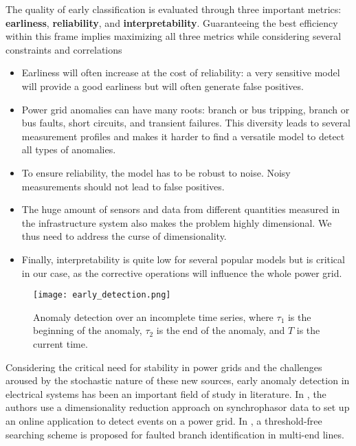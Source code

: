 The quality of early classification is evaluated through three important metrics:  \textbf{earliness}, \textbf{reliability}, and \textbf{interpretability}. Guaranteeing the best efficiency within this frame implies maximizing all three metrics while considering several constraints and correlations
\begin{itemize}
    \item Earliness will often increase at the cost of reliability: a very sensitive model will provide a good earliness but will often generate false positives.
    \item Power grid anomalies can have many roots: branch or bus tripping, branch or bus faults, short circuits, and transient failures. This diversity leads to several measurement profiles and makes it harder to find a versatile model to detect all types of anomalies.
    \item To ensure reliability, the model has to be robust to noise. Noisy measurements should not lead to false positives.
    \item The huge amount of sensors and data from different quantities measured in the infrastructure system also makes the problem highly dimensional. We thus need to address the curse of dimensionality.
    \item Finally, interpretability is quite low for several popular models \cite{Nazir202163} but is critical in our case, as the corrective operations will influence the whole power grid.
\end{itemize}

\begin{figure}[t]
	\centering
    \texttt{[image: early\_detection.png]}
	\caption{Anomaly detection over an incomplete time series, where $\tau_1$ is the beginning of the anomaly, $\tau_2$ is the end of the anomaly, and $T$ is the current time.}
	\label{fig:early_detection}
\end{figure}

Considering the critical need for stability in power grids and the challenges aroused by the stochastic nature of these new sources, early anomaly detection in electrical systems has been an important field of study in literature. In \cite{6808416}, the authors use a dimensionality reduction approach on synchrophasor data to set up an online application to detect events on a power grid. In \cite{SABER20201113}, a threshold-free searching scheme is proposed for faulted branch identification in multi-end lines. 

